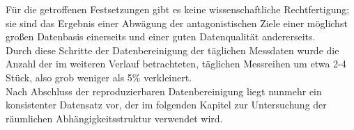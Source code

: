 Für die getroffenen Festsetzungen gibt es keine wissenschaftliche 
Rechtfertigung; sie sind das Ergebnis einer Abwägung 
der antagonistischen Ziele einer möglichst großen Datenbasis 
einerseits und einer guten Datenqualität andererseits. \\

Durch diese Schritte der Datenbereinigung der täglichen 
Messdaten wurde die Anzahl der im weiteren Verlauf 
betrachteten, täglichen Messreihen um etwa 2-4 Stück, also grob
weniger als 5\% verkleinert. \\

Nach Abschluss der reproduzierbaren Datenbereinigung liegt
nunmehr ein konsistenter Datensatz vor, der im folgenden 
Kapitel zur Untersuchung der räumlichen Abhängig\-keits\-struk\-tur
verwendet wird.
  


